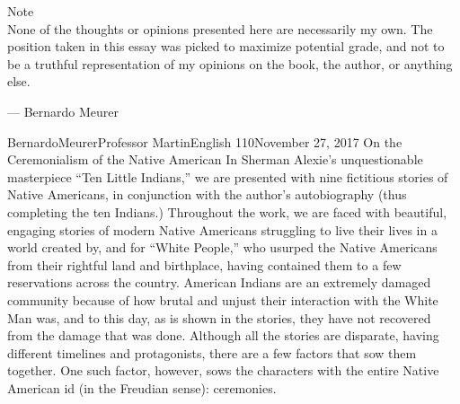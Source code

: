 \documentclass[12pt,letterpaper]{article}
\begin{document}
    \begin{center}
        \vfill
        \huge{Note}\\
        \normalsize
        None of the thoughts or opinions presented here are necessarily my own. The position taken in this essay was picked to maximize potential grade, and not to be a truthful representation of my opinions on the book, the author, or anything else.
        \begin{flushright}
            --- Bernardo Meurer
        \end{flushright}
        \vfill
    \end{center}
    \newpage
    \setcounter{page}{1}
    \begin{mla}{Bernardo}{Meurer}{Professor Martin}{English 110}{November 27, 2017}%
        {On the Ceremonialism of the Native American}
        In Sherman Alexie's unquestionable masterpiece ``Ten Little Indians,'' we are presented with nine fictitious stories of Native Americans, in conjunction with the author's autobiography (thus completing the ten Indians.) Throughout the work, we are faced with beautiful, engaging stories of modern Native Americans struggling to live their lives in a world created by, and for ``White People,'' who usurped the Native Americans from their rightful land and birthplace, having contained them to a few reservations across the country. American Indians are an extremely damaged community because of how brutal and unjust their interaction with the White Man was, and to this day, as is shown in the stories, they have not recovered from the damage that was done. Although all the stories are disparate, having different timelines and protagonists, there are a few factors that sow them together. One such factor, however, sows the characters with the entire Native American id (in the Freudian sense): ceremonies.


\end{mla}
\end{document}
